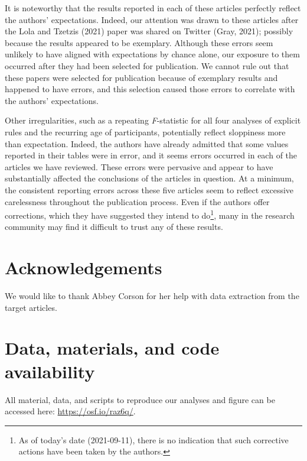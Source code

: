 \documentclass[
  english,
  man, donotrepeattitle,floatsintext]{apa7}
\begin{document}
It is noteworthy that the results reported in each of these articles perfectly reflect the authors' expectations. Indeed, our attention was drawn to these articles after the Lola and Tzetzis (2021) paper was shared on Twitter (Gray, 2021); possibly because the results appeared to be exemplary. Although these errors seem unlikely to have aligned with expectations by chance alone, our exposure to them occurred after they had been selected for publication. We cannot rule out that these papers were selected for publication because of exemplary results and happened to have errors, and this selection caused those errors to correlate with the authors' expectations.

Other irregularities, such as a repeating \emph{F}-statistic for all four analyses of explicit rules and the recurring age of participants, potentially reflect sloppiness more than expectation. Indeed, the authors have already admitted that some values reported in their tables were in error, and it seems errors occurred in each of the articles we have reviewed. These errors were pervasive and appear to have substantially affected the conclusions of the articles in question. At a minimum, the consistent reporting errors across these five articles seem to reflect excessive carelessness throughout the publication process. Even if the authors offer corrections, which they have suggested they intend to do\footnote{As of today's date (2021-09-11), there is no indication that such corrective actions have been taken by the authors.}, many in the research community may find it difficult to trust any of these results.

\hypertarget{acknowledgements}{%
\section{Acknowledgements}\label{acknowledgements}}

We would like to thank Abbey Corson for her help with data extraction from the target articles.

\hypertarget{data-materials-and-code-availability}{%
\section{Data, materials, and code availability}\label{data-materials-and-code-availability}}

\label{sec:sharing} All material, data, and scripts to reproduce our analyses and figure can be accessed here: \url{https://osf.io/raz6q/}.
\end{document}
